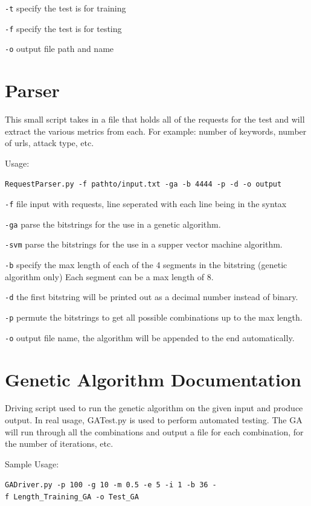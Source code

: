 \begin{appendices}
\texttt{-t} specify the test is for training

\texttt{-f} specify the test is for testing

\texttt{-o} output file path and name

\section{Parser}  \label{app:parserDocumentation}

This small script takes in a file that holds all of the requests for the
test and will extract the various metrics from each. For example: number
of keywords, number of urls, attack type, etc.

Usage:

\texttt{RequestParser.py\ -f\ pathto/input.txt\ -ga\ -b\ 4444\ -p\ -d\ -o\ output}

\texttt{-f} file input with requests, line seperated with each line
being in the syntax

\texttt{-ga} parse the bitstrings for the use in a genetic algorithm.

\texttt{-svm} parse the bitstrings for the use in a supper vector
machine algorithm.

\texttt{-b} specify the max length of each of the 4 segments in the
bitstring (genetic algorithm only) Each segment can be a max length of
8.

\texttt{-d} the first bitstring will be printed out as a decimal number
instead of binary.

\texttt{-p} permute the bitstrings to get all possible combinations up
to the max length.

\texttt{-o} output file name, the algorithm will be appended to the end
automatically.

\section{Genetic Algorithm Documentation} \label{app:geneticDocumentation}

Driving script used to run the genetic algorithm on the given input and
produce output. In real usage, GATest.py is used to perform automated
testing. The GA will run through all the combinations and output a file
for each combination, for the number of iterations, etc.

Sample Usage:

\texttt{GADriver.py\ -p\ 100\ -g\ 10\ -m\ 0.5\ -e\ 5\ -i\ 1\ -b\ 36\ -f\ Length\_Training\_GA\ -o\ Test\_GA}


\end{appendices}

